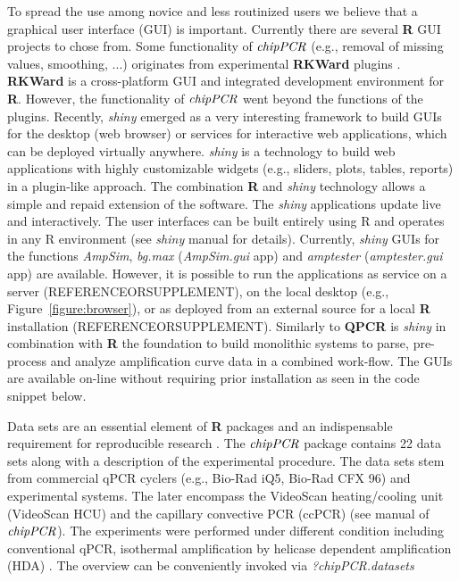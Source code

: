 \documentclass[twocolumn]{bmcart}%
\begin{document}
To spread the use among novice and less routinized users we believe that a 
graphical user interface (GUI) is important. Currently there are several 
\textbf{R} GUI projects \cite{Valero_2012} to chose from. Some functionality of 
$\emph{chipPCR}$ (e.g., removal of missing values, smoothing, ...) originates 
from experimental \textbf{RKWard} plugins \cite{roediger_bead_qPCR_2013, 
roediger_RKWard_2013}. \textbf{RKWard} \cite{rodiger_rkward_2012} is a 
cross-platform GUI and integrated development environment for \textbf{R}. 
However, the functionality of $\emph{chipPCR}$ went beyond the functions of the 
plugins. Recently, \emph{shiny} emerged as a very interesting framework to build 
GUIs for the desktop (web browser) or services for interactive web applications, 
which can be deployed virtually anywhere. \emph{shiny} is a technology to build 
web applications with highly customizable widgets (e.g., sliders, plots, tables, 
reports) in a plugin-like approach. The combination \textbf{R} and \emph{shiny} 
technology allows a simple and repaid extension of the software. The 
\emph{shiny} applications update live and interactively. The user interfaces can 
be built entirely using R and operates in any R environment (see \emph{shiny} 
manual for details). Currently, \emph{shiny} GUIs for the functions 
\textsl{AmpSim}, \textsl{bg.max} (\textsl{AmpSim.gui} app) and 
\textsl{amptester} (\textsl{amptester.gui} app) are available. However, it is 
possible to run the applications as service on a server (REFERENCEORSUPPLEMENT), 
on the local desktop (e.g., Figure~\ref{figure:browser}), or as deployed from an 
external source for a local \textbf{R} installation (REFERENCEORSUPPLEMENT). 
Similarly to \textbf{QPCR} \cite{pabinger_2009} is \emph{shiny} in combination 
with \textbf{R} the foundation to build monolithic systems to parse, pre-process 
and analyze amplification curve data in a combined work-flow. The GUIs are 
available on-line without requiring prior installation as seen in the code 
snippet below.

Data sets are an essential element of \textbf{R} packages \cite{hofmann_2013} 
and an indispensable requirement for reproducible research \cite{Leeper_2014}. 
The $\emph{chipPCR}$ package contains 22 data sets along with a description of 
the experimental procedure. The data sets stem from commercial qPCR cyclers 
(e.g., Bio-Rad iQ5, Bio-Rad CFX 96) and experimental systems. The later 
encompass the VideoScan heating/cooling unit (VideoScan HCU) 
\cite{roediger_highly_2013} and the capillary convective PCR (ccPCR) (see 
manual 
of $\emph{chipPCR}$). The experiments were performed under different condition 
including conventional qPCR, isothermal amplification by helicase dependent 
amplification (HDA) \cite{rodiger_nucleic_2014}. The overview can be 
conveniently invoked via \textsl{?chipPCR.datasets}
\end{document}
